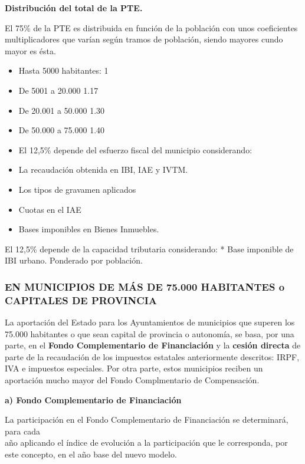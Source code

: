 \documentclass[
]{article}
\providecommand{\tightlist}{%
  \setlength{\itemsep}{0pt}\setlength{\parskip}{0pt}}
\begin{document}
\textbf{Distribución del total de la PTE.}

El 75\% de la PTE es distribuida en función de la población con unos
coeficientes multiplicadores que varían según tramos de población,
siendo mayores cundo mayor es ésta.

\begin{itemize}
\tightlist
\item
  Hasta 5000 habitantes: 1
\item
  De 5001 a 20.000 1.17
\item
  De 20.001 a 50.000 1.30
\item
  De 50.000 a 75.000 1.40
\item
  El 12,5\% depende del esfuerzo fiscal del municipio considerando:
\item
  La recaudación obtenida en IBI, IAE y IVTM.
\item
  Los tipos de gravamen aplicados
\item
  Cuotas en el IAE
\item
  Bases imponibles en Bienes Inmuebles.
\end{itemize}

El 12,5\% depende de la capacidad tributaria considerando: * Base
imponible de IBI urbano. Ponderado por población.

\hypertarget{en-municipios-de-muxe1s-de-75.000-habitantes-o-capitales-de-provincia}{%
\subsubsection{EN MUNICIPIOS DE MÁS DE 75.000 HABITANTES o CAPITALES DE
PROVINCIA}\label{en-municipios-de-muxe1s-de-75.000-habitantes-o-capitales-de-provincia}}

La aportación del Estado para los Ayuntamientos de municipios que
superen los 75.000 habitantes o que sean capital de provincia o
autonomía, se basa, por una parte, en el \textbf{Fondo Complementario de
Financiación} y la \textbf{cesión directa} de parte de la recaudación de
los impuestos estatales anteriormente descritos: IRPF, IVA e impuestos
especiales. Por otra parte, estos municipios reciben un aportación mucho
mayor del Fondo Complmentario de Compensación.

\textbf{a) Fondo Complementario de Financiación}

La participación en el Fondo Complementario de Financiación se
determinará, para cada\\
año aplicando el índice de evolución a la participación que le
corresponda, por este concepto, en el año base del nuevo modelo.
\end{document}
